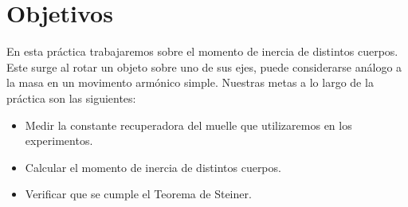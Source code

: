 \documentclass[12pt, a4paper, titlepage]{article}
\begin{document}
  \section{Objetivos}

  En esta práctica trabajaremos sobre el momento de inercia de distintos cuerpos. Este surge al rotar un objeto sobre uno de sus ejes, puede considerarse análogo a la masa en un movimento armónico simple. Nuestras metas a lo largo de la práctica son las siguientes:
  \begin{itemize}[label=$-$]
    \item Medir la constante recuperadora del muelle que utilizaremos en los experimentos.
    \item Calcular el momento de inercia de distintos cuerpos.
    \item Verificar que se cumple el Teorema de Steiner.
  \end{itemize}
\end{document}
